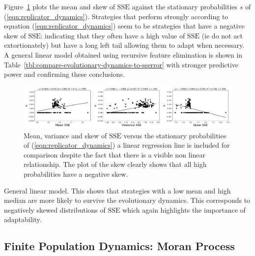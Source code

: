 \documentclass[a4paper]{article}
\newcommand{\SSe}{\text{SSE}}
\begin{document}
Figure~\ref{fig:compare-evolutionary-dynamics-to-sserror} plots the mean and
skew of \(\SSe\) against the stationary probabilities \(s\) of
(\ref{eqn:replicator_dynamics}). Strategies that perform strongly according to
equation (\ref{eqn:replicator_dynamics}) seem to be strategies that have a
negative skew of \(\SSe\): indicating that they often have a high value of
\(\SSe\) (ie do not act extortionately) but have a long left tail allowing them
to adapt when necessary. A general linear model obtained using recursive feature
elimination is shown in Table~\ref{tbl:compare-evolutionary-dynamics-to-sserror}
with stronger predictive power and confirming these conclusions.

\begin{figure}[!hbtp]
    \centering
    \includegraphics[width=\textwidth]{./assets/img/compare-evolutionary-dynamics-to-sserror/main.pdf}
    \caption{Mean, variance and skew of \(\SSe\) versus the stationary
    probabilities of (\ref{eqn:replicator_dynamics}) a linear regression line is
    included for comparison despite the fact that there is a visible non linear
    relationship. The plot of the skew clearly shows that all high probabilities
    have a negative skew.}
    \label{fig:compare-evolutionary-dynamics-to-sserror}
\end{figure}

\begin{table}[!hbtp]
    \begin{center}
    \tiny
    
    \end{center}
    \caption{General linear model. This shows that strategies with a low mean
    and high median are more likely to survive the evolutionary dynamics. This
    corresponds to negatively skewed distributions of \(\SSe\) which again
    highlights the importance of adaptability.}
    \label{tbl:compare-evolutionary-dynamics-to-sserror}
\end{table}

\subsection{Finite Population Dynamics: Moran Process}
\end{document}

